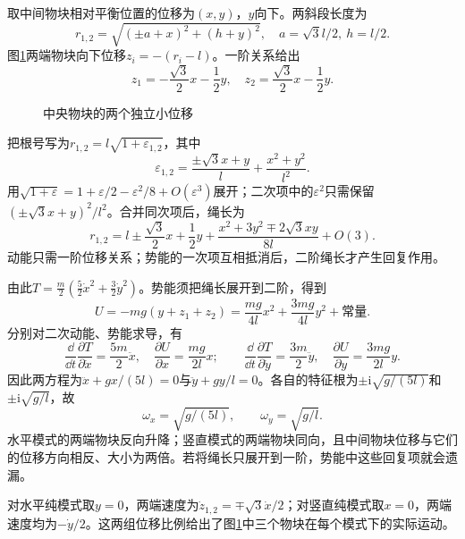 \begin{solution}
取中间物块相对平衡位置的位移为$(x,y)$，$y$向下。两斜段长度为
\[
 r_{1,2}=\sqrt{(\pm a+x)^2+(h+y)^2},\quad
 a=\sqrt3l/2,\ h=l/2.
\]
图\ref{fig:hw4-2-s}两端物块向下位移$z_i=-(r_i-l)$。一阶关系给出
\[
 z_1=-\frac{\sqrt3}{2}x-\frac12y,\quad
 z_2=\frac{\sqrt3}{2}x-\frac12y.
\]

\begin{figure}[H]\centering
{}
\caption{中央物块的两个独立小位移}\label{fig:hw4-2-s}
\end{figure}

把根号写为$r_{1,2}=l\sqrt{1+\varepsilon_{1,2}}$，其中
\[
\varepsilon_{1,2}=\frac{\pm\sqrt3x+y}{l}+\frac{x^2+y^2}{l^2}.
\]
用$\sqrt{1+\varepsilon}=1+\varepsilon/2-\varepsilon^2/8+O(\varepsilon^3)$展开；二次项中的$\varepsilon^2$只需保留$(\pm\sqrt3x+y)^2/l^2$。合并同次项后，绳长为
\[
 r_{1,2}=l\pm\frac{\sqrt3}{2}x+\frac12y
 +\frac{x^2+3y^2\mp2\sqrt3xy}{8l}+O(3).
\]
动能只需一阶位移关系；势能的一次项互相抵消后，二阶绳长才产生回复作用。

由此$T=\frac m2(\frac52\dot x^2+\frac32\dot y^2)$。势能须把绳长展开到二阶，得到
\[
 U=-mg(y+z_1+z_2)
 =\frac{mg}{4l}x^2+\frac{3mg}{4l}y^2+\text{常量}.
\]
分别对二次动能、势能求导，有
\[
\frac{\dd}{\dd t}\frac{\partial T}{\partial\dot x}
=\frac{5m}{2}\ddot x,\quad
\frac{\partial U}{\partial x}=\frac{mg}{2l}x;
\qquad
\frac{\dd}{\dd t}\frac{\partial T}{\partial\dot y}
=\frac{3m}{2}\ddot y,\quad
\frac{\partial U}{\partial y}=\frac{3mg}{2l}y.
\]
因此两方程为$\ddot x+gx/(5l)=0$与$\ddot y+gy/l=0$。各自的特征根为$\pm\mathrm i\sqrt{g/(5l)}$和$\pm\mathrm i\sqrt{g/l}$，故
\[
 \boxed{\omega_x=\sqrt{g/(5l)},\qquad\omega_y=\sqrt{g/l}}.
\]
水平模式的两端物块反向升降；竖直模式的两端物块同向，且中间物块位移与它们的位移方向相反、大小为两倍。若将绳长只展开到一阶，势能中这些回复项就会遗漏。


对水平纯模式取$y=0$，两端速度为$\dot z_{1,2}=\mp\sqrt3\dot x/2$；对竖直纯模式取$x=0$，两端速度均为$-\dot y/2$。这两组位移比例给出了图\ref{fig:hw4-2-s}中三个物块在每个模式下的实际运动。

\end{solution}



